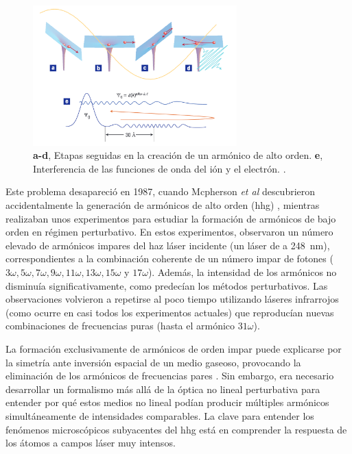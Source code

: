\begin{figure}[htbp]
  \centering
  \includegraphics[width=0.7\textwidth]{Figuras/ch1_hhg.png}
  \caption{\textbf{a-d}, Etapas seguidas en la creación de un armónico de alto orden. \textbf{e}, Interferencia de las funciones de onda del ión y el electrón. \autocite{Corkum2007}.}
  \label{fig:1.19}
\end{figure}

Este problema desapareció en 1987, cuando Mcpherson \emph{et al} descubrieron accidentalmente la generación de armónicos de alto orden (\acrshort{hhg}) \autocite{McPherson1987}, mientras realizaban unos experimentos para estudiar la formación de armónicos de bajo orden en régimen perturbativo. En estos experimentos, observaron un número elevado de armónicos impares del haz láser incidente (un láser de  a \qty{248}{nm}), correspondientes a la combinación coherente de un número impar de fotones ($3 \omega, 5 \omega, 7 \omega, 9 \omega, 11 \omega, 13 \omega, 15 \omega$ y $17 \omega$). Además, la intensidad de los armónicos no disminuía significativamente, como predecían los métodos perturbativos. Las observaciones volvieron a repetirse al poco tiempo utilizando láseres infrarrojos \autocite{Ferray1988} (como ocurre en casi todos los experimentos actuales) que reproducían nuevas combinaciones de frecuencias puras (hasta el armónico $31 \omega$).

La formación exclusivamente de armónicos de orden impar puede explicarse por la simetría ante inversión espacial de un medio gaseoso, provocando la eliminación de los armónicos de frecuencias pares \autocite{Milonni1988}. Sin embargo, era necesario desarrollar un formalismo más allá de la óptica no lineal perturbativa para entender por qué estos medios no lineal podían producir múltiples armónicos simultáneamente de intensidades comparables. La clave para entender los fenómenos microscópicos subyacentes del \acrshort{hhg} está en comprender la respuesta de los átomos a campos láser muy intensos.


